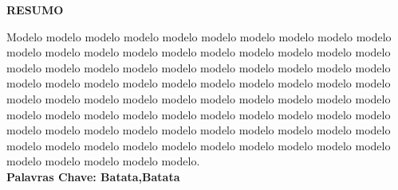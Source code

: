 \begin{center}
   \textbf{RESUMO}
\end{center}

\hspace{2cm}

\begin{justify}
    
    Modelo modelo modelo modelo modelo modelo modelo modelo modelo modelo modelo modelo modelo modelo modelo modelo modelo modelo modelo modelo modelo modelo modelo modelo modelo modelo modelo modelo modelo modelo modelo modelo modelo modelo modelo modelo modelo modelo modelo modelo modelo modelo modelo modelo modelo modelo modelo modelo modelo modelo modelo modelo modelo modelo modelo modelo modelo modelo modelo modelo modelo modelo modelo modelo modelo modelo modelo modelo modelo modelo modelo modelo modelo modelo modelo modelo modelo modelo modelo modelo modelo modelo modelo modelo modelo.\\

    \textbf{Palavras Chave: Batata,Batata}

\end{justify}

\thispagestyle{empty}